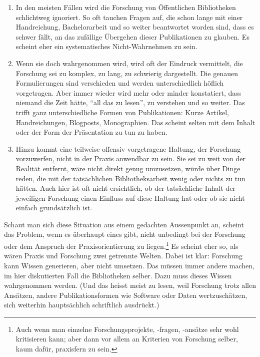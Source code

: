 \documentclass[a4paper,
fontsize=11pt,
oneside,
numbers=noperiodatend,
parskip=half-,
bibliography=totoc,
final
]{scrartcl}
\begin{document}
\begin{enumerate}
\def\labelenumi{(\arabic{enumi})}
\item
  In den meisten Fällen wird die Forschung von Öffentlichen Bibliotheken
  schlichtweg ignoriert. So oft tauchen Fragen auf, die schon lange mit
  einer Handreichung, Bachelorarbeit und so weiter beantwortet worden
  sind, dass es schwer fällt, an das zufällige Übergehen dieser
  Publikationen zu glauben. Es scheint eher ein systematisches
  Nicht-Wahrnehmen zu sein.
\item
  Wenn sie doch wahrgenommen wird, wird oft der Eindruck vermittelt, die
  Forschung sei zu komplex, zu lang, zu schwierig dargestellt. Die
  genauen Formulierungen sind verschieden und werden unterschiedlich
  höflich vorgetragen. Aber immer wieder wird mehr oder minder
  konstatiert, dass niemand die Zeit hätte, \enquote{all das zu lesen},
  zu verstehen und so weiter. Das trifft ganz unterschiedliche Formen
  von Publikationen: Kurze Artikel, Handreichungen, Blogposts,
  Monographien. Das scheint selten mit dem Inhalt oder der Form der
  Präsentation zu tun zu haben.
\item
  Hinzu kommt eine teilweise offensiv vorgetragene Haltung, der
  Forschung vorzuwerfen, nicht in der Praxis anwendbar zu sein. Sie sei
  zu weit von der Realität entfernt, wäre nicht direkt genug umzusetzen,
  würde über Dinge reden, die mit der tatsächlichen Bibliotheksarbeit
  wenig oder nichts zu tun hätten. Auch hier ist oft nicht ersichtlich,
  ob der tatsächliche Inhalt der jeweiligen Forschung einen Einfluss auf
  diese Haltung hat oder ob sie nicht einfach grundsätzlich ist.
\end{enumerate}

Schaut man sich diese Situation aus einem gedachten Aussenpunkt an,
scheint das Problem, wenn es überhaupt eines gibt, nicht unbedingt bei
der Forschung oder dem Anspruch der Praxisorientierung zu
liegen.\footnote{Auch wenn man einzelne Forschungsprojekte, -fragen,
  -ansätze sehr wohl kritisieren kann; aber dann vor allem an Kriterien
  von Forschung selber, kaum dafür, praxisfern zu sein.} Es scheint eher
so, als wären Praxis und Forschung zwei getrennte Welten. Dabei ist
klar: Forschung kann Wissen generieren, aber nicht umsetzen. Das müssen
immer andere machen, im hier diskutierten Fall die Bibliotheken selber.
Dazu muss dieses Wissen wahrgenommen werden. (Und das heisst meist zu
lesen, weil Forschung trotz allen Ansätzen, andere Publikationsformen
wie Software oder Daten wertzuschätzen, sich weiterhin hauptsächlich
schriftlich ausdrückt.)
\end{document}
